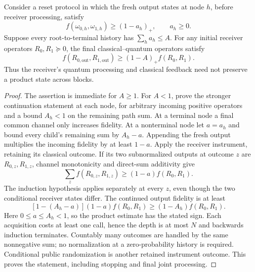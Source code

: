 \begin{lemma}\label{lem:resetfidelity88}
Consider a reset protocol in which the fresh output states at node
$h$, before receiver processing, satisfy
\[
 f(\omega_{0,h},\omega_{1,h})\ge(1-a_h)_+,
 \qquad a_h\ge0.
\]
Suppose every root-to-terminal history has $\sum_h a_h\le A$.
For any initial receiver operators $R_0,R_1\succeq0$, the final
classical--quantum operators satisfy
\begin{equation}\label{eq:fidelityaccumulation88}
 f(R_{0,\mathrm{out}},R_{1,\mathrm{out}})
 \ge (1-A)_+f(R_0,R_1).
\end{equation}
Thus the receiver's quantum processing and classical feedback need
not preserve a product state across blocks.
\end{lemma}
\begin{proof}
The assertion is immediate for $A\ge1$.  For $A<1$, prove the stronger
continuation statement at each node, for arbitrary incoming positive
operators and a bound $A_h<1$ on the remaining path sum.  At a terminal
node a final common channel only increases fidelity.  At a nonterminal
node let $a=a_h$ and bound every child's remaining sum by $A_h-a$.
Appending the fresh output multiplies the incoming fidelity by at
least $1-a$.  Apply the receiver instrument, retaining its classical
outcome.  If its two subnormalized outputs at outcome $z$ are
$R_{0,z},R_{1,z}$, channel monotonicity and direct-sum additivity give
\[
 \sum_z f(R_{0,z},R_{1,z})
 \ge (1-a)f(R_0,R_1).
\]
The induction hypothesis applies separately at every $z$, even
though the two conditional receiver states differ.  The continued
output fidelity is at least
\[
 [1-(A_h-a)](1-a)f(R_0,R_1)
 \ge(1-A_h)f(R_0,R_1).
\]
Here $0\le a\le A_h<1$, so the product estimate has the stated
sign.  Each acquisition costs at least one call, hence the depth is
at most $N$ and backwards induction terminates.  Countably many
outcomes are handled by the same nonnegative sum; no normalization
at a zero-probability history is required.  Conditional public
randomization is another retained instrument outcome.  This proves
the statement, including stopping and final joint processing.
\end{proof}

